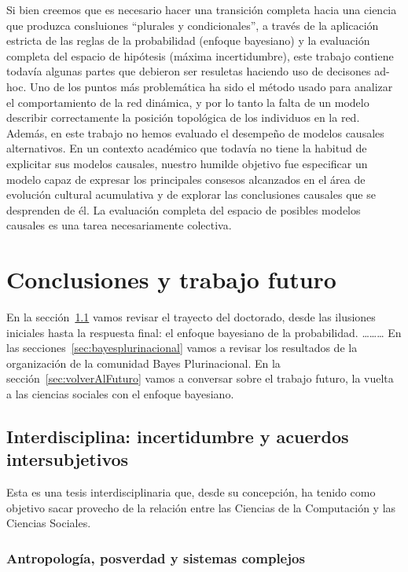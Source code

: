 \documentclass[a4paper,11pt]{book}
\theoremstyle{definition}
\begin{document}
Si bien creemos que es necesario hacer una transición completa hacia una ciencia que produzca consluiones ``plurales y condicionales'', a través de la aplicación estricta de las reglas de la probabilidad (enfoque bayesiano) y la evaluación completa del espacio de hipótesis (máxima incertidumbre), este trabajo contiene todavía algunas partes que debieron ser resuletas haciendo uso de decisones ad-hoc.
%
Uno de los puntos más problemática ha sido el método usado para analizar el comportamiento de la red dinámica, y por lo tanto la falta de un modelo describir correctamente la posición topológica de los individuos en la red.
%
Además, en este trabajo no hemos evaluado el desempeño de modelos causales alternativos.
%
En un contexto académico que todavía no tiene la habitud de explicitar sus modelos causales, nuestro humilde objetivo fue especificar un modelo capaz de expresar los principales consesos alcanzados en el área de evolución cultural acumulativa y de explorar las conclusiones causales que se desprenden de él.
%
La evaluación completa del espacio de posibles modelos causales es una tarea necesariamente colectiva.


\chapter{Conclusiones y trabajo futuro}


En la sección~\ref{sec:doctorado} vamos revisar el trayecto del doctorado, desde las ilusiones iniciales hasta la respuesta final: el enfoque bayesiano de la probabilidad.
%
\dots \dots \dots
%
En las secciones~\ref{sec:bayesplurinacional} vamos a revisar los resultados de la organización de la comunidad Bayes Plurinacional.
%
En la sección~\ref{sec:volverAlFuturo} vamos a conversar sobre el trabajo futuro, la vuelta a las ciencias sociales con el enfoque bayesiano.


\section{Interdisciplina: incertidumbre y acuerdos intersubjetivos} \label{sec:doctorado}


Esta es una tesis interdisciplinaria que, desde su concepción, ha tenido como objetivo sacar provecho de la relación entre las Ciencias de la Computación y las Ciencias Sociales.

%

\subsection{Antropología, posverdad y sistemas complejos}
\end{document}
